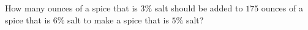How many ounces of a spice that is $3\%$ salt should be added to $175$ ounces of a spice that is $6\%$ salt to make a spice that is $5\%$ salt?
